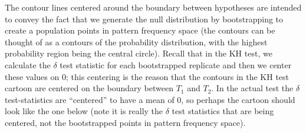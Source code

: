 \documentclass[11pt]{article}
\begin{document}
The contour lines centered around the boundary between hypotheses are intended to convey the fact that we generate the null distribution by bootstrapping to create a population points in pattern frequency space (the contours can be thought of as a contours of the probability distribution, with the highest probability region being the central circle).
Recall that in the KH test, we calculate the $\delta$ test statistic for each bootstrapped replicate and then we center these values on 0; this centering is the reason that the contours in the KH test cartoon are centered on the boundary between $T_1$ and $T_2$.
In the actual test the $\delta$ test-statistics are ``centered'' to have a mean of 0, so perhaps the cartoon should look like the one below (note it is really the $\delta$ test statistics that are being centered, not the bootstrapped points in pattern frequency space).
\end{document}
